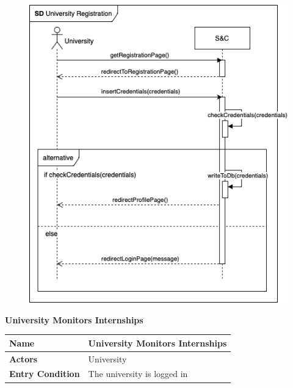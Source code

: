 \begin{enumerate}[label=\textbf{[US\arabic*]}, left = 0pt, align = left, resume]
            \newpage
            \begin{figure}[h!]
                \centering  \includegraphics[width=1\textwidth]{RASD/Images/UseCases/US18_UniversityRegistration.drawio.png}
                \label{fig:example}
            \end{figure}
            
            \newpage
            \item \textbf{University Monitors Internships}
            
            \begin{longtable}{|l|p{11cm}|}  
                \hline
                \textbf{Name} & 
                    \textbf{University Monitors Internships} \\
                \hline
                
                \textbf{Actors} & 
                    University \\
                \hline
                
                \textbf{Entry Condition} & 
                    The university is logged in \\
                \hline
                

\end{longtable}
\end{enumerate}
